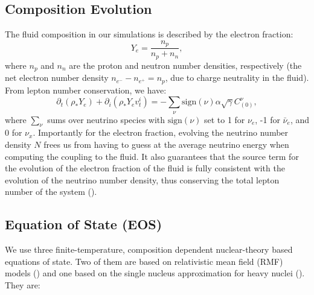 \subsection{Composition Evolution}

The fluid composition in our simulations is described by the electron fraction:
%
\begin{equation}
  Y_e = \frac{n_p}{n_p + n_n},
\end{equation}
%
where $n_p$ and $n_n$ are the proton and neutron number densities, respectively (the net electron number density $n_{e^{-}} - n_{e^{+}} = n_p$, due to charge neutrality in the fluid). From lepton number conservation, we have:
%
\begin{equation}
  \partial_t \left(\rho_* Y_e \right) + \partial_i\left(\rho_*Y_e v_t^i\right)= -\sum_{\nu}\textrm{sign}(\nu)\alpha \sqrt{\gamma} C^{\nu}_{(0)},
\end{equation}
%
where $\sum_{\nu}$ sums over neutrino species with $\textrm{sign}(\nu)$ set to 1 for $\nu_e$, -1 for $\bar \nu_e$, and 0 for $\nu_x$. Importantly for the electron fraction, evolving the neutrino number density $N$ frees us from having to guess at the average neutrino energy when computing the coupling to the fluid. It also guarantees that the source term for the evolution of the electron fraction of the fluid is fully consistent with the evolution of the neutrino number density, thus conserving the total lepton number of the system (\citet*{foucart2016impact}). 

\subsection{Equation of State (EOS)}

We use three finite-temperature, composition dependent nuclear-theory based equations of state. Two of them are based on relativistic mean field (RMF) models  (\citet*{walecka1974theory}) and one based on the single nucleus approximation for heavy nuclei (\citet*{lattimer1991generalized}). They are:

